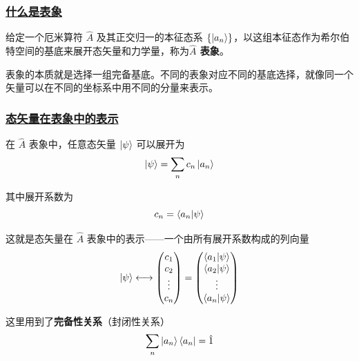 \subsubsection{\protect\hyperlink{:}{什么是表象}}

\begin{definition}[表象]
    给定一个厄米算符 $\hat{A}$ 及其正交归一的本征态系 $\{\ket{a_n}\}$，以这组本征态作为希尔伯特空间的基底来展开态矢量和力学量，称为\textbf{$\hat{A}$ 表象}。
\end{definition}

表象的本质就是选择一组完备基底。不同的表象对应不同的基底选择，就像同一个矢量可以在不同的坐标系中用不同的分量来表示。

\subsubsection{\protect\hyperlink{:}{态矢量在表象中的表示}}

在 $\hat{A}$ 表象中，任意态矢量 $\ket{\psi}$ 可以展开为
\begin{equation}
    \ket{\psi} = \sum_n c_n\ket{a_n}
\end{equation}

其中展开系数为
\begin{equation}
    c_n = \braket{a_n}{\psi}
\end{equation}

这就是态矢量在 $\hat{A}$ 表象中的表示——一个由所有展开系数构成的列向量
\begin{equation}
    \ket{\psi} \longleftrightarrow
    \begin{pmatrix}
        c_1 \\ c_2 \\ \vdots \\ c_n
    \end{pmatrix}
    =
    \begin{pmatrix}
        \braket{a_1}{\psi} \\ \braket{a_2}{\psi} \\ \vdots \\ \braket{a_n}{\psi}
    \end{pmatrix}
\end{equation}

这里用到了\textbf{完备性关系}（封闭性关系）
\begin{equation}
    \sum_n \ket{a_n}\bra{a_n} = \hat{1}
\end{equation}

